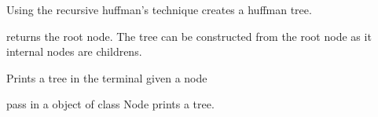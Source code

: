 \documentclass[letterpaper,10pt,english]{sphinxmanual}
\begin{document}
\begin{fulllineitems}
\begin{fulllineitems}
\label{\detokenize{huffman:huffman.Huffman.huffman_tree}}
\pysigstartsignatures
{}
\pysigstopsignatures
\sphinxAtStartPar
Using the recursive huffman’s technique creates a huffman tree.
\begin{description}
\begin{description}
\sphinxAtStartPar
returns the root node. The tree can be constructed from the root node as it internal nodes are childrens.

\end{description}

\end{description}

\end{fulllineitems}


\begin{fulllineitems}
\label{\detokenize{huffman:huffman.Huffman.print_tree}}
\pysigstartsignatures
{}
\pysigstopsignatures
\sphinxAtStartPar
Prints a tree in the terminal given a node
\begin{description}
\begin{description}
\sphinxAtStartPar
pass in a object of class Node prints a tree.

\end{description}

\end{description}


\end{fulllineitems}
\end{fulllineitems}
\end{document}
